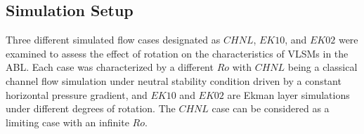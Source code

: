 \documentclass{amsart}
\begin{document}

\subsection{Simulation Setup}

Three different simulated flow cases designated as $CHNL$, $EK10$, and $EK02$ were examined to assess the effect of rotation on the characteristics of VLSMs in the ABL. Each case was characterized by a different $Ro$ with $CHNL$ being a classical channel flow simulation under neutral stability condition driven by a constant horizontal pressure  gradient, and $EK10$ and $EK02$ are Ekman layer simulations under different degrees of rotation. The $CHNL$ case can be considered as a limiting case with an infinite $Ro$. 
\end{document}
